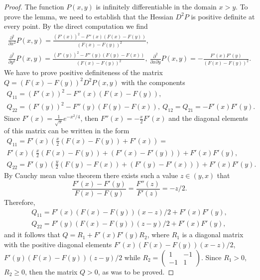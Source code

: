 \documentclass[12pt]{article}
\theoremstyle{plain}
\theoremstyle{definition}
\numberwithin{equation}{section}
\begin{document}
\begin{proof}
The function $P(x,y)$ is infinitely differentiable in the domain $x>y$. To prove the lemma, we need to establish that the Hessian $D^2 P$ is positive definite at every point. By the direct computation we find
\begin{align*}
\frac{\partial^2}{\partial x^2} P(x,y)=\frac{(F'(x))^2-F''(x)(F(x)-F(y))}{(F(x)-F(y))^2}, \\
\frac{\partial^2}{\partial y^2} P(x,y)=\frac{(F'(y))^2-F''(y)(F(y)-F(x))}{(F(x)-F(y))^2}, \
\frac{\partial^2}{\partial x\partial y} P(x,y)=-\frac{F'(x)F'(y)}{(F(x)-F(y))^2}.
\end{align*}
We have to prove positive definiteness of the matrix $Q=(F(x)-F(y))^2 D^2 P(x,y)$ with the components
\begin{align*}
Q_{11}=(F'(x))^2-F''(x)(F(x)-F(y)), \\ Q_{22}=(F'(y))^2-F''(y)(F(y)-F(x)), \ Q_{12}=Q_{21}=-F'(x)F'(y).
\end{align*}
Since $F'(x)=\frac{1}{\sqrt{\pi}}e^{-x^2/4}$, then $F''(x)=-\frac{x}{2}F'(x)$ and the diagonal elements of this matrix can be written in the form
\begin{align*}
Q_{11}=F'(x)(\frac{x}{2}(F(x)-F(y))+F'(x))= \\ F'(x)(\frac{x}{2}(F(x)-F(y))+(F'(x)-F'(y)))+F'(x)F'(y), \\
Q_{22}=F'(y)(\frac{y}{2}(F(y)-F(x))+(F'(y)-F'(x)))+F'(x)F'(y).
\end{align*}
By Cauchy mean value theorem there exists such a value $z\in (y,x)$ that
\[
\frac{F'(x)-F'(y)}{F(x)-F(y)}=\frac{F''(z)}{F'(z)}=-z/2.
\]
Therefore,
\begin{align*}
Q_{11}=F'(x)(F(x)-F(y))(x-z)/2+F'(x)F'(y), \\ Q_{22}=F'(y)(F(x)-F(y))(z-y)/2+F'(x)F'(y),
\end{align*}
and it follows that $Q=R_1+F'(x)F'(y)R_2$, where $R_1$ is a diagonal matrix with the positive diagonal elements
$F'(x)(F(x)-F(y))(x-z)/2$, $F'(y)(F(x)-F(y))(z-y)/2$ while $R_2=\left(\begin{smallmatrix} 1 & -1 \\ -1 & 1\end{smallmatrix}\right)$. Since $R_1>0$, $R_2\ge 0$, then the matrix $Q>0$, as was to be proved.
\end{proof}
\end{document}
